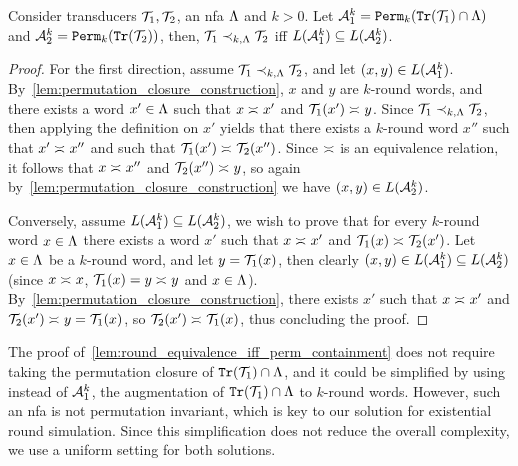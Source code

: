 \begin{lemma}
\label{lem:round_equivalence_iff_perm_containment}
	Consider transducers $\mathcal{T}_1,\mathcal{T}_2$, an \gls{nfa} $\Lambda$ and $k>0$. Let $\mathcal{A}_1^k={\mathtt{Perm}}_k({\mathtt{Tr}}(\mathcal{T}_1)\cap\Lambda)$ and $\mathcal{A}_2^k={\mathtt{Perm}}_k({\mathtt{Tr}}(\mathcal{T}_2))$,
	then, $\mathcal{T}_1\prec_{k,\Lambda} \mathcal{T}_2$ iff $L(\mathcal{A}^k_1)\subseteq L(\mathcal{A}^k_2)$.
\end{lemma}
\begin{proof}
	For the first direction, assume $\mathcal{T}_1\prec_{k,\Lambda} \mathcal{T}_2$, and let $(x,y)\in L(\mathcal{A}^k_1)$. By~\cref{lem:permutation_closure_construction}, $x$ and $y$ are $k$-round words, and there exists a word $x'\in \Lambda$ such that $x\asymp_{} x'$ and $\mathcal{T}_1(x')\asymp_{} y$. Since $\mathcal{T}_1\prec_{k,\Lambda} \mathcal{T}_2$, then applying the definition on $x'$ yields that there exists a $k$-round word $x''$ such that $x'\asymp_{} x''$ and such that $\mathcal{T}_1(x')\asymp_{} \mathcal{T}_2(x'')$. Since $\asymp_{}$ is an equivalence relation, it follows that $x\asymp_{} x''$ and $\mathcal{T}_2(x'')\asymp_{} y$, so again by~\cref{lem:permutation_closure_construction} we have $(x,y)\in L(\mathcal{A}^k_2)$.
	
	Conversely, assume $L(\mathcal{A}^k_1)\subseteq L(\mathcal{A}^k_2)$, we wish to prove that for every $k$-round word $x\in \Lambda$ there exists a word $x'$ such that $x\asymp_{} x'$ and $\mathcal{T}_1(x)\asymp_{} \mathcal{T}_2(x')$. Let $x\in \Lambda$ be a $k$-round word, and let $y=\mathcal{T}_1(x)$, then clearly $(x,y)\in L(\mathcal{A}^k_1)\subseteq L(\mathcal{A}^k_2)$ (since $x\asymp_{} x$, $\mathcal{T}_1(x)=y\asymp_{} y$ and $x\in \Lambda$). By~\cref{lem:permutation_closure_construction}, there exists $x'$ such that $x\asymp_{} x'$ and $\mathcal{T}_2(x')\asymp_{} y=\mathcal{T}_1(x)$, so $\mathcal{T}_2(x')\asymp_{} \mathcal{T}_1(x)$, thus concluding the proof.
\end{proof}

\begin{remark}
\label{rmk:det_A1}
The proof of~\cref{lem:round_equivalence_iff_perm_containment} does not require taking the permutation closure of ${\mathtt{Tr}}(\mathcal{T}_1)\cap \Lambda$, and it could be simplified by using instead of $\mathcal{A}^k_1$, the augmentation of ${\mathtt{Tr}}(\mathcal{T}_1)\cap \Lambda$ to $k$-round words. However, such an \gls{nfa} is not permutation invariant, which is key to our solution for existential round simulation. Since this simplification does not reduce the overall complexity, we use a uniform setting for both solutions.
\end{remark}

